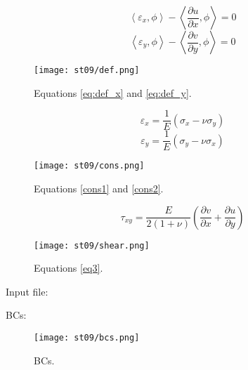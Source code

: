 \documentclass[11pt,letterpaper]{article}
\begin{document}
\begin{equation}
\left< \varepsilon_x, \phi \right> - \left< \frac{\partial u}{\partial x}, \phi \right> = 0
\label{eq:def_x}
\end{equation}
\begin{equation}
\left< \varepsilon_y, \phi \right> - \left< \frac{\partial v}{\partial y}, \phi \right> = 0
\label{eq:def_y}
\end{equation}
\begin{figure}[H]
	\centering
	\texttt{[image: st09/def.png]}
	\hfill
	\caption{Equations \ref{eq:def_x} and \ref{eq:def_y}.}
	\label{fig:def_xy}
\end{figure}

\begin{equation}
\varepsilon_x = \frac{1}{E} (\sigma_x - \nu \sigma_y)
\label{cons1}
\end{equation}
\begin{equation}
\varepsilon_y = \frac{1}{E} (\sigma_y - \nu \sigma_x)
\label{cons2}
\end{equation}
\begin{figure}[H]
	\centering
	\texttt{[image: st09/cons.png]}
	\hfill
	\caption{Equations \ref{cons1} and \ref{cons2}.}
	\label{fig:cons_xy}
\end{figure}

\begin{equation}
\tau_{xy} = \frac{E}{2(1+\nu)} (\frac{\partial v}{\partial x} + \frac{\partial u}{\partial y})
\end{equation}
\begin{figure}[H]
	\centering
	\texttt{[image: st09/shear.png]}
	\hfill
	\caption{Equations \ref{eq3}.}
	\label{fig:shear}
\end{figure}

Input file:

BCs: 
\begin{figure}[H]
	\centering
	\texttt{[image: st09/bcs.png]}
	\hfill
	\caption{BCs.}
	\label{fig:bcs}
\end{figure}

\pagebreak 

%
\end{document}
